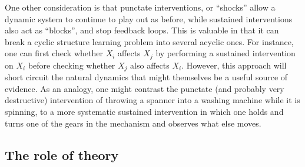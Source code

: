 \documentclass{cambridge7A}%
\begin{document}
One other consideration is that punctate interventions, or ``shocks'' allow a dynamic system to continue to play out as before,  while sustained interventions also act as ``blocks'', and stop feedback loops.  This is valuable in that it can break a cyclic structure learning problem into several acyclic ones.  For instance, one can first check whether $X_i$ affects $X_j$ by performing a sustained intervention on $X_i$ before checking whether $X_j$ also affects $X_i$.  However, this approach will short circuit the natural dynamics that might themselves be a useful source of evidence.  As an analogy, one might contrast the punctate (and probably very destructive) intervention of throwing a spanner into a washing machine while it is spinning, to a more systematic sustained intervention in which one holds and turns one of the gears in the mechanism and observes what else moves.  %

\subsection{The role of theory}
\end{document}
